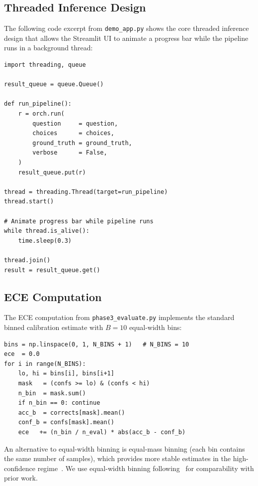 \documentclass[conference]{IEEEtran}
\begin{document}
\subsection{Threaded Inference Design}

The following code excerpt from \texttt{demo\_app.py} shows the core
threaded inference design that allows the Streamlit UI to animate a
progress bar while the pipeline runs in a background thread:

\begin{lstlisting}[caption={Threaded pipeline execution in demo\_app.py},
                   label={lst:thread}]
import threading, queue

result_queue = queue.Queue()

def run_pipeline():
    r = orch.run(
        question     = question,
        choices      = choices,
        ground_truth = ground_truth,
        verbose      = False,
    )
    result_queue.put(r)

thread = threading.Thread(target=run_pipeline)
thread.start()

# Animate progress bar while pipeline runs
while thread.is_alive():
    time.sleep(0.3)

thread.join()
result = result_queue.get()
\end{lstlisting}

\subsection{ECE Computation}

The ECE computation from \texttt{phase3\_evaluate.py} implements the
standard binned calibration estimate with $B=10$ equal-width bins:

\begin{lstlisting}[caption={ECE computation (phase3\_evaluate.py)},
                   label={lst:ece}]
bins = np.linspace(0, 1, N_BINS + 1)   # N_BINS = 10
ece  = 0.0
for i in range(N_BINS):
    lo, hi = bins[i], bins[i+1]
    mask   = (confs >= lo) & (confs < hi)
    n_bin  = mask.sum()
    if n_bin == 0: continue
    acc_b  = corrects[mask].mean()
    conf_b = confs[mask].mean()
    ece   += (n_bin / n_eval) * abs(acc_b - conf_b)
\end{lstlisting}
An alternative to equal-width binning is equal-mass binning (each
bin contains the same number of samples), which provides more
stable estimates in the high-confidence regime~\cite{nixon2019measuring}.
We use equal-width binning following~\cite{guo2017calibration} for
comparability with prior work.
\end{document}
